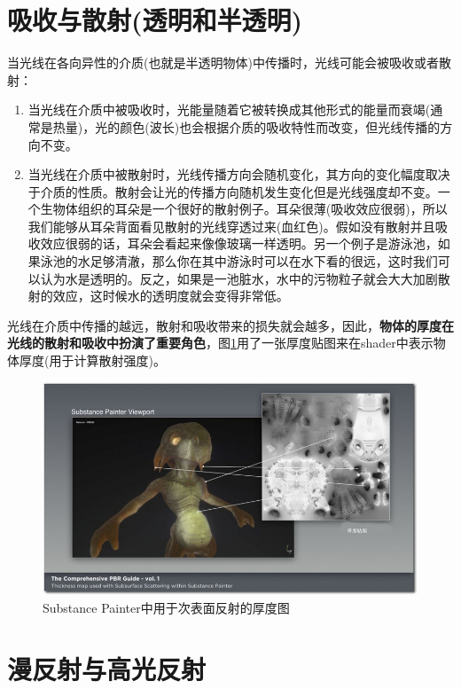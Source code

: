 \section{吸收与散射(透明和半透明)}

当光线在各向异性的介质(也就是半透明物体)中传播时，光线可能会被吸收或者散射：

\begin{enumerate}
\item 当光线在介质中被吸收时，光能量随着它被转换成其他形式的能量而衰竭(通常是热量)，光的颜色(波长)也会根据介质的吸收特性而改变，但光线传播的方向不变。
\item 当光线在介质中被散射时，光线传播方向会随机变化，其方向的变化幅度取决于介质的性质。散射会让光的传播方向随机发生变化但是光线强度却不变。一个生物体组织的耳朵是一个很好的散射例子。耳朵很薄(吸收效应很弱)，所以我们能够从耳朵背面看见散射的光线穿透过来(血红色)。假如没有散射并且吸收效应很弱的话，耳朵会看起来像像玻璃一样透明。另一个例子是游泳池，如果泳池的水足够清澈，那么你在其中游泳时可以在水下看的很远，这时我们可以认为水是透明的。反之，如果是一池脏水，水中的污物粒子就会大大加剧散射的效应，这时候水的透明度就会变得非常低。
\end{enumerate}

光线在介质中传播的越远，散射和吸收带来的损失就会越多，因此，\textbf{物体的厚度在光线的散射和吸收中扮演了重要角色}，图\ref{fig:chap1_2}用了一张厚度贴图来在shader中表示物体厚度(用于计算散射强度)。

\begin{figure}[ht]
    \centering
	\includegraphics[width=\textwidth]{images/chap1_2.jpg}
	\caption{Substance Painter中用于次表面反射的厚度图}
    \label{fig:chap1_2}
\end{figure}

\section{漫反射与高光反射}

